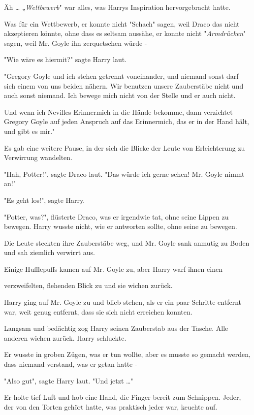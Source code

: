 {Äh … „\emph{Wettbewerb}" war alles, was Harrys Inspiration hervorgebracht hatte.

Was für ein Wettbewerb, er konnte nicht "Schach" sagen, weil Draco das nicht akzeptieren könnte, ohne dass es seltsam aussähe, er konnte nicht "\emph{Armdrücken}" sagen, weil Mr. Goyle ihn zerquetschen würde -

"Wie wäre es hiermit?" sagte Harry laut.

"Gregory Goyle und ich stehen getrennt voneinander, und niemand sonst darf sich einem von uns beiden nähern. Wir benutzen unsere Zauberstäbe nicht und auch sonst niemand. Ich bewege mich nicht von der Stelle und er auch nicht.

Und wenn ich Nevilles Erinnermich in die Hände bekomme, dann verzichtet Gregory Goyle auf jeden Anspruch auf das Erinnermich, das er in der Hand hält, und gibt es mir."

Es gab eine weitere Pause, in der sich die Blicke der Leute von Erleichterung zu Verwirrung wandelten.

"Hah, Potter!", sagte Draco laut. "Das würde ich gerne sehen! Mr. Goyle nimmt an!"

"Es geht los!", sagte Harry.

"Potter, was?", flüsterte Draco, was er irgendwie tat, ohne seine Lippen zu bewegen. Harry wusste nicht, wie er antworten sollte, ohne seine zu bewegen.

Die Leute steckten ihre Zauberstäbe weg, und Mr. Goyle sank anmutig zu Boden und sah ziemlich verwirrt aus.

Einige Hufflepuffs kamen auf Mr. Goyle zu, aber Harry warf ihnen einen

verzweifelten, flehenden Blick zu und sie wichen zurück.

Harry ging auf Mr. Goyle zu und blieb stehen, als er ein paar Schritte entfernt war, weit genug entfernt, dass sie sich nicht erreichen konnten.

Langsam und bedächtig zog Harry seinen Zauberstab aus der Tasche. Alle anderen wichen zurück. Harry schluckte.

Er wusste in groben Zügen, was er tun wollte, aber es musste so gemacht werden, dass niemand verstand, was er getan hatte -

"Also gut", sagte Harry laut. "Und jetzt …"

Er holte tief Luft und hob eine Hand, die Finger bereit zum Schnippen. Jeder, der von den Torten gehört hatte, was praktisch jeder war, keuchte auf.

}
